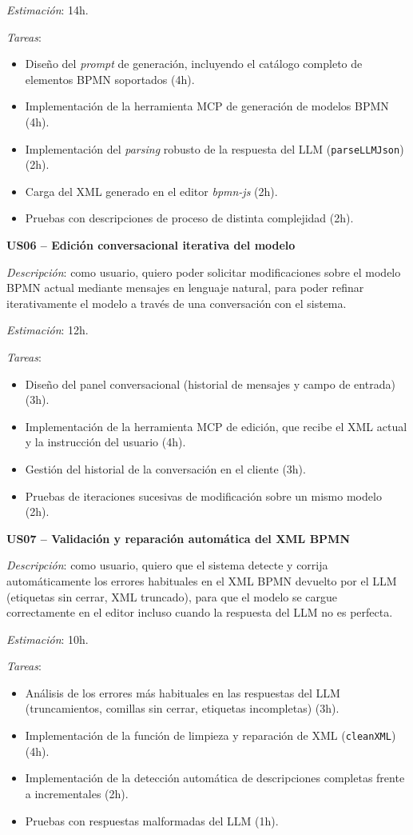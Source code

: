 {\textit{Estimación}: 14h.

\textit{Tareas}:
\begin{itemize}
    \item Diseño del \textit{prompt} de generación, incluyendo el catálogo completo de elementos BPMN soportados (4h).
    \item Implementación de la herramienta MCP de generación de modelos BPMN (4h).
    \item Implementación del \textit{parsing} robusto de la respuesta del LLM (\texttt{parseLLMJson}) (2h).
    \item Carga del XML generado en el editor \textit{bpmn-js} (2h).
    \item Pruebas con descripciones de proceso de distinta complejidad (2h).
\end{itemize}

\textbf{US06 -- Edición conversacional iterativa del modelo}

\textit{Descripción}: como usuario, quiero poder solicitar modificaciones sobre el modelo BPMN actual mediante mensajes en lenguaje natural, para poder refinar iterativamente el modelo a través de una conversación con el sistema.

\textit{Estimación}: 12h.

\textit{Tareas}:
\begin{itemize}
    \item Diseño del panel conversacional (historial de mensajes y campo de entrada) (3h).
    \item Implementación de la herramienta MCP de edición, que recibe el XML actual y la instrucción del usuario (4h).
    \item Gestión del historial de la conversación en el cliente (3h).
    \item Pruebas de iteraciones sucesivas de modificación sobre un mismo modelo (2h).
\end{itemize}

\textbf{US07 -- Validación y reparación automática del XML BPMN}

\textit{Descripción}: como usuario, quiero que el sistema detecte y corrija automáticamente los errores habituales en el XML BPMN devuelto por el LLM (etiquetas sin cerrar, XML truncado), para que el modelo se cargue correctamente en el editor incluso cuando la respuesta del LLM no es perfecta.

\textit{Estimación}: 10h.

\textit{Tareas}:
\begin{itemize}
    \item Análisis de los errores más habituales en las respuestas del LLM (truncamientos, comillas sin cerrar, etiquetas incompletas) (3h).
    \item Implementación de la función de limpieza y reparación de XML (\texttt{cleanXML}) (4h).
    \item Implementación de la detección automática de descripciones completas frente a incrementales (2h).
    \item Pruebas con respuestas malformadas del LLM (1h).
\end{itemize}



}
